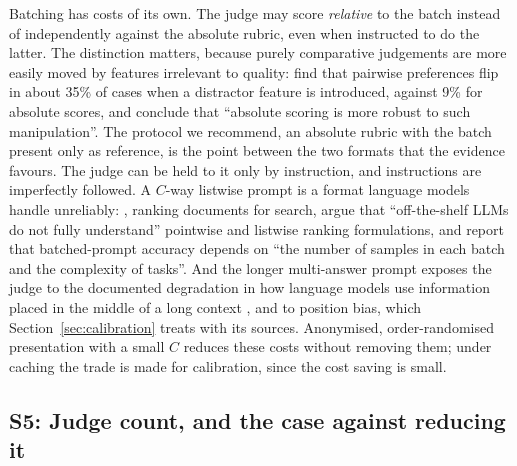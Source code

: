 \documentclass[11pt]{article}
\begin{document}
Batching has costs of its own. The judge may score \emph{relative} to the batch instead of independently against the absolute rubric, even when instructed to do the latter. The distinction matters, because purely comparative judgements are more
easily moved by features irrelevant to quality: \citet{tripathi2025pairwise} find that
pairwise preferences flip in about 35\% of cases when a distractor feature is introduced,
against 9\% for absolute scores, and conclude that ``absolute scoring is more robust to
such manipulation''. The protocol we recommend, an absolute rubric with the batch present only as reference, is the point between the two formats that the evidence favours. The judge can be held to it only by instruction, and instructions are imperfectly followed. A $C$-way listwise prompt is a format language models
handle unreliably: \citet{qin2024prp}, ranking documents for search, argue that ``off-the-shelf LLMs do not fully
understand'' pointwise and listwise ranking formulations, and \citet{cheng2023batch}
report that batched-prompt accuracy depends on ``the number of samples in each batch and
the complexity of tasks''. And the longer multi-answer prompt exposes the judge to the
documented degradation in how language models use information placed in the middle of a
long context \citep{liu2024lostmiddle}, and to position bias, which
Section~\ref{sec:calibration} treats with its sources. Anonymised, order-randomised presentation with a small $C$ reduces these costs without removing them; under caching the trade is made for calibration, since the cost saving is small.

\subsection{S5: Judge count, and the case against reducing it}
\end{document}
